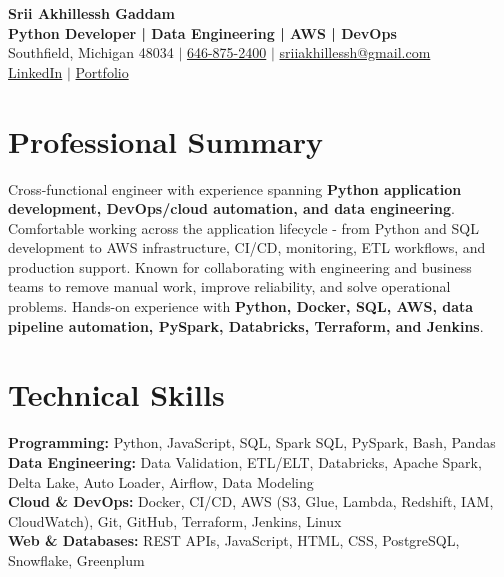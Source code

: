 \documentclass[letterpaper,10pt]{article}
\begin{document}
\fontsize{9.35pt}{10.45pt}\selectfont

\begin{center}
    {\LARGE \textbf{Srii Akhillessh Gaddam}} \\[-1pt]
    \textbf{Python Developer | Data Engineering | AWS | DevOps} \\[2pt]
    Southfield, Michigan 48034 $|$
    \href{tel:6468752400}{646-875-2400} $|$
    \href{mailto:sriiakhillessh@gmail.com}{sriiakhillessh@gmail.com} \\[1pt]
    \href{https://www.linkedin.com/in/srii-akhiilessh-gaddam-b48668191/}{LinkedIn} $|$
    \href{https://sriiakhillesshg.github.io/portfolio/}{Portfolio}
\end{center}
\vspace{-8pt}

\section{Professional Summary}
\small{Cross-functional engineer with experience spanning \textbf{Python application development, DevOps/cloud automation, and data engineering}. Comfortable working across the application lifecycle - from Python and SQL development to AWS infrastructure, CI/CD, monitoring, ETL workflows, and production support. Known for collaborating with engineering and business teams to remove manual work, improve reliability, and solve operational problems. Hands-on experience with \textbf{Python, Docker, SQL, AWS, data pipeline automation, PySpark, Databricks, Terraform, and Jenkins}.}

\section{Technical Skills}
\small{
\textbf{Programming:} Python, JavaScript, SQL, Spark SQL, PySpark, Bash, Pandas \\
\textbf{Data Engineering:} Data Validation, ETL/ELT, Databricks, Apache Spark, Delta Lake, Auto Loader, Airflow, Data Modeling \\
\textbf{Cloud \& DevOps:} Docker, CI/CD, AWS (S3, Glue, Lambda, Redshift, IAM, CloudWatch), Git, GitHub, Terraform, Jenkins, Linux \\
\textbf{Web \& Databases:} REST APIs, JavaScript, HTML, CSS, PostgreSQL, Snowflake, Greenplum
}
\end{document}
